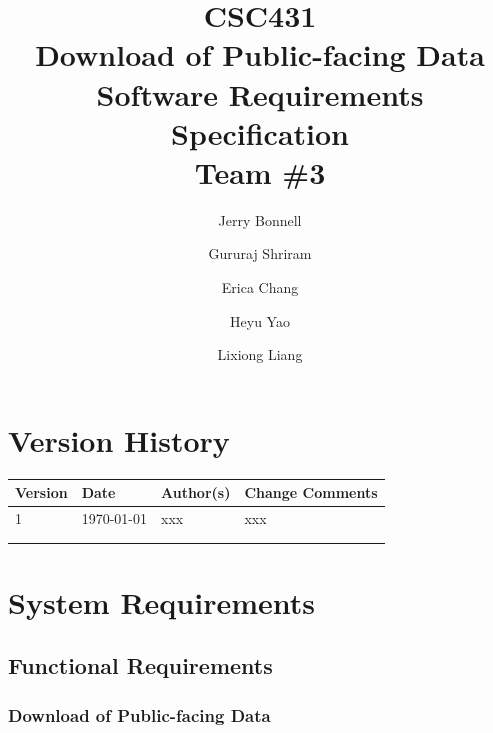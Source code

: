 \documentclass{article}
\begin{document}
\title{
	CSC431 \\
	\vspace{0.2in}
	\textbf{Download of Public-facing Data} \\
	\large Software Requirements Specification \\
	Team \#3
}

\author{
	Jerry Bonnell
	\and Gururaj Shriram
	\and Erica Chang
	\and Heyu Yao
	\and Lixiong Liang
}

\date{}
\maketitle

\clearpage
\section*{Version History}

\begin{tabularx}{\textwidth}{| l | l | X | X |}
	\hline
	\textbf{Version} & \textbf{Date} & \textbf{Author(s)} & \textbf{Change Comments} \\
	\hline
	1                & \today        & xxx                & xxx                      \\
	\hline
	                 &               &                    &                          \\
	\hline
	                 &               &                    &                          \\
	\hline
\end{tabularx}

\clearpage
\tableofcontents

\clearpage
\listoffigures
\listoftables

\clearpage

\section{System Requirements}

\subsection{Functional Requirements}

\subsubsection{Download of Public-facing Data}
\end{document}
